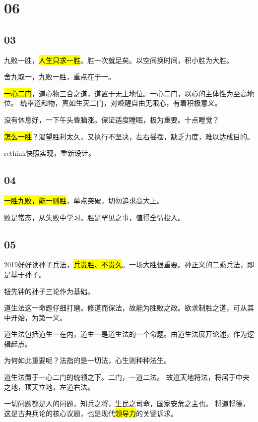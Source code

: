 \section{06}

\subsection{03}

九败一胜，\hl{人生只求一胜}。胜一次就足矣。以空间换时间，积小胜为大胜。

舍九取一，九败一胜，重点在于一。

\hl{一心二门}，道心物三合之道，道置于无上地位。一心二门，以心的主体性为至高地位。
统率道和物，真如生灭二门，对唤醒自由无限心，有着积极意义。

没有休息好，一下午头昏脑涨。保证适度睡眠，极为重要。十点睡觉？

\hl{怎么一胜}？渴望胜利太久，又执行不坚决，左右摇摆，缺乏力度，难以达成目的。

\hrulefill

rethink快照实现，重新设计。

\subsection{04}

\hl{一胜九败，能一则胜}，单点突破，切勿追求高大上。

败是常态，从失败中学习。胜是罕见之事，值得全情投入。

\subsection{05}

2019好好读孙子兵法，\hl{兵贵胜、不贵久}。一场大胜很重要。孙正义的二乘兵法，即是基于孙子。

钮先钟的孙子三论作为基础。

道生法这一命题仔细打磨。修道而保法，故能为胜败之政。欲求制胜之道，可从其中开始，为第一义。

道生法包括道生一在内，道生一是道生法的一个命题。由道生法展开论述，作为逻辑起点。

为何如此重要呢？法指的是一切法，心生则种种法生。

道生法置于一心二门的统领之下。二门，一道二法。
故道天地将法，将居于中央之地，顶天立地，左道右法。

一切问题都是人的问题，知兵之将，生民之司命，国家安危之主也。
将道将德，这是古典兵论的核心议题，也是现代\hl{领导力}的关键诉求。


